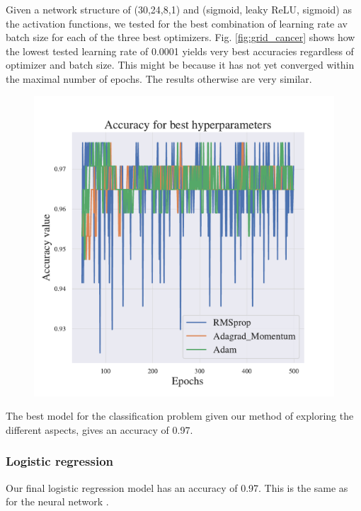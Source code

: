 Given a network structure of (30,24,8,1) and (sigmoid, leaky ReLU, sigmoid) as the activation functions, we tested for the best combination of learning rate av batch size for each of the three best optimizers. Fig. \ref{fig:grid_cancer} shows how the lowest tested learning rate of 0.0001 yields very best accuracies regardless of optimizer and batch size. This might be because it has not yet converged within the maximal number of epochs. 
The results otherwise are very similar. 

\begin{figure}[h!]
    \centering
    \includegraphics[width=1.0\linewidth]{project_2/figures/best_classification.pdf}
    \caption{}
    \label{fig:best_cancer}
\end{figure}

The best model for the classification problem given our method of exploring the different aspects, gives an accuracy of 0.97. 


\subsubsection{Logistic regression}

Our final logistic regression model has an accuracy of 0.97. This is the same as for the neural network .

